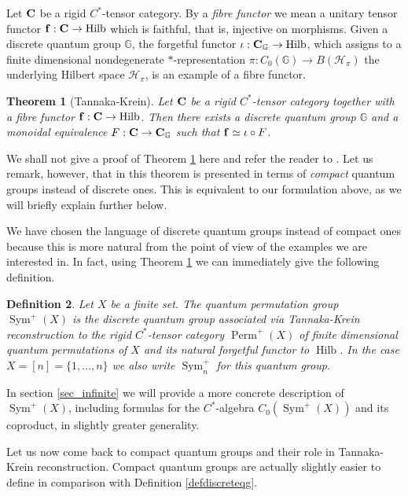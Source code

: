 \documentclass[a4paper]{amsart}
\newcommand*{\Hc}{\mathcal{H}}
\newcommand*{\Bf}{{\bf f}}
\newcommand*{\BC}{{\bf C}}
\newcommand{\GG}{\mathbb{G}}
\DeclareMathOperator{\Hilb}{Hilb}
\DeclareMathOperator{\Perm}{Perm}
\DeclareMathOperator{\Sym}{Sym}
\numberwithin{equation}{section}
\theoremstyle{change}
\newtheorem{theorem}{Theorem}[section]
\newtheorem{definition}[theorem]{Definition}
\begin{document}
Let $ \BC $ be a rigid $ C^* $-tensor category. By a \emph{fibre functor} we mean a unitary tensor functor $ \Bf: \BC \rightarrow \Hilb $ which is faithful, that is, injective 
on morphisms. Given a discrete quantum group $ \GG $, the forgetful functor $ \iota: \BC_\GG \rightarrow \Hilb $, which assigns to a finite dimensional 
nondegenerate $ * $-representation $ \pi: C_0(\GG) \rightarrow B(\Hc_\pi) $ the underlying Hilbert space $ \Hc_\pi $, is an example of a fibre functor. 

\begin{theorem}[Tannaka-Krein] \label{TK}
Let $ \BC $ be a rigid $ C^* $-tensor category together with a fibre functor $ \Bf: \BC \rightarrow \Hilb $. Then there exists a discrete quantum group $ \GG $ 
and a monoidal equivalence $ F: \BC \rightarrow \BC_\GG $ such that $ \Bf \simeq \iota \circ F $. 
\end{theorem} 

We shall not give a proof of Theorem \ref{TK} here and refer the reader to \cite[Section 2.3]{NESHVEYEV_TUSET_compactquantumgroups}. Let us remark, however, that 
in \cite{NESHVEYEV_TUSET_compactquantumgroups} this theorem is presented in terms of \emph{compact} quantum groups instead of discrete ones.  
This is equivalent to our formulation above, as we will briefly explain further below. 

We have chosen the language of discrete quantum groups instead of compact ones because this is more natural from the point of view of the examples we are interested in. In fact, using Theorem \ref{TK} we can immediately give the following definition.  

\begin{definition} \label{defqpermgroupfinite}
Let $ X $ be a finite set. The quantum permutation group $ \Sym^+(X) $ is the discrete quantum group associated via Tannaka-Krein reconstruction to the rigid $ C^* $-tensor category $ \Perm^+(X) $ of finite dimensional quantum permutations of $ X $ and its natural forgetful functor to $ \Hilb $. 
In the case $ X = [n] = \{1, \dots, n\} $ we also write $ \Sym^+_n $ for this quantum group. 
\end{definition}

In section \ref{sec_infinite} we will provide a more concrete description of $ \Sym^+(X) $, including formulas for the $ C^* $-algebra $ C_0(\Sym^+(X)) $ and its coproduct, in slightly greater generality.

Let us now come back to compact quantum groups and their role in Tannaka-Krein reconstruction. Compact quantum groups are actually slightly easier to define in comparison with Definition \ref{defdiscreteqg}. 
\end{document}
